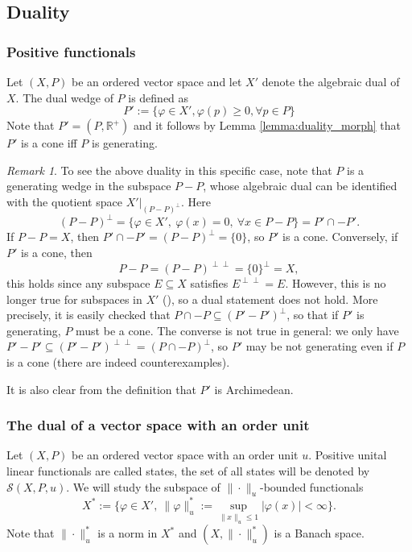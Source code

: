 \documentclass[12pt]{article}
\theoremstyle{remark}
\newtheorem{rem}{Remark}
\newcommand{\<}{\langle}
\begin{document}
\subsection{Duality}
\subsubsection*{Positive functionals}

Let $(X,P)$ be an ordered vector space and let $X'$ denote the algebraic dual of $X$. The dual wedge of $P$ is defined as
\[
P':=\{\varphi\in X', \varphi(p)\ge 0, \forall p\in P\}
\]
  Note that  $P'=(P,\mathbb R^+)$ and it follows by  Lemma \ref{lemma:duality_morph} that 
	$P'$ is a cone iff $P$ is generating. 
	
\begin{rem}
To see the above duality in this specific case, note that $P$ is a generating wedge in the subspace $P-P$, whose algebraic dual can be identified with the quotient space $X'|_{(P-P)^\perp}$. Here
\[
(P-P)^\perp=\{\varphi\in X',\ \varphi(x)=0,\ \forall x\in P-P\}=P'\cap-P'.
\]
If $P-P=X$, then $P'\cap-P'=(P-P)^\perp=\{0\}$, so $P'$ is a cone. Conversely, if $P'$ is a cone, then 
\[
P-P=(P-P)^{\perp\perp}=\{0\}^\perp=X,
\]
this holds since any subspace $E\subseteq X$ satisfies $E^{\perp\perp}=E$. However, this is no longer true for subspaces in $X'$ (\cite{kothe}), so a dual statement does not hold. More precisely, it is easily checked that $P\cap -P\subseteq (P'-P')^\perp$, so that 
 if $P'$ is generating, $P$ must be a cone. The converse is not true in general: we only have $P'-P'\subseteq (P'-P')^{\perp\perp}=
 (P\cap -P)^\perp$, so $P'$ may be not generating even if $P$ is a cone (there are indeed counterexamples).
\end{rem}

It is also clear from the definition that $P'$ is  Archimedean.


\subsubsection*{The  dual of a vector space with an order unit } 


Let $(X,P)$ be an ordered vector space with an order unit $u$. Positive unital linear functionals are called states, the set of all 
 states will be denoted by $\mathcal S(X,P,u)$. We will study the subspace of $\|\cdot\|_u$-bounded functionals
\[
X^*:=\{\varphi\in X', \ \|\varphi\|_u^*:=\sup_{\|x\|_u\le 1}|\varphi(x)|<\infty\}.
\]
Note that $\|\cdot\|_u^*$ is a norm in $X^*$ and $(X,\|\cdot\|_u^*)$ is a Banach space.
\end{document}
